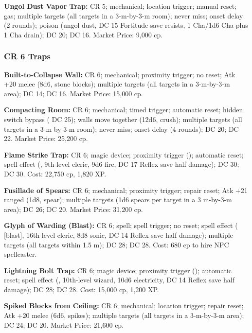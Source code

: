 \textbf{Ungol Dust Vapor Trap:} CR 5; mechanical; location trigger; manual reset; gas; multiple targets (all targets in a 3-m-by-3-m room); never miss; onset delay (2 rounds); poison (ungol dust, DC 15 Fortitude save resists, 1 Cha/1d6 Cha plus 1 Cha drain);  DC 20;  DC 16. Market Price: 9,000 cp.

\subsubsection{CR 6 Traps}
\textbf{Built-to-Collapse Wall:} CR 6; mechanical; proximity trigger; no reset; Atk +20 melee (8d6, stone blocks); multiple targets (all targets in a 3-m-by-3-m area);  DC 14;  DC 16. Market Price: 15,000 cp.

\textbf{Compacting Room:} CR 6; mechanical; timed trigger; automatic reset; hidden switch bypass ( DC 25); walls move together (12d6, crush); multiple targets (all targets in a 3-m by 3-m room); never miss; onset delay (4 rounds);  DC 20;  DC 22. Market Price: 25,200 cp.

\textbf{Flame Strike Trap:} CR 6; magic device; proximity trigger (); automatic reset; spell effect (, 9th-level cleric, 9d6 fire, DC 17 Reflex save half damage);  DC 30;  DC 30. Cost: 22,750 cp, 1,820 XP.

\textbf{Fusillade of Spears:} CR 6; mechanical; proximity trigger; repair reset; Atk +21 ranged (1d8, spear); multiple targets (1d6 spears per target in a 3 m-by-3-m area);  DC 26;  DC 20. Market Price: 31,200 cp.

\textbf{Glyph of Warding (Blast):} CR 6; spell; spell trigger; no reset; spell effect ( [blast], 16th-level cleric, 8d8 sonic, DC 14 Reflex save half damage); multiple targets (all targets within 1.5 m);  DC 28;  DC 28. Cost: 680 cp to hire NPC spellcaster.

\textbf{Lightning Bolt Trap:} CR 6; magic device; proximity trigger (); automatic reset; spell effect (, 10th-level wizard, 10d6 electricity, DC 14 Reflex save half damage);  DC 28;  DC 28. Cost: 15,000 cp, 1,200 XP.

\textbf{Spiked Blocks from Ceiling:} CR 6; mechanical; location trigger; repair reset; Atk +20 melee (6d6, spikes); multiple targets (all targets in a 3-m-by-3-m area);  DC 24;  DC 20. Market Price: 21,600 cp.

